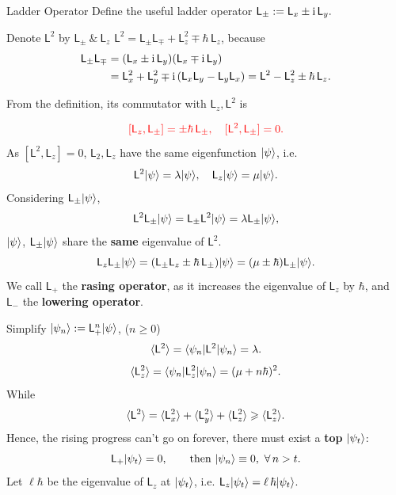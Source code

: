 \documentclass{article}
\newcommand*{\op}[1]{\mathsf{#1}}
\newcommand{\spark}[1]{\textcolor{red}{#1}}
\begin{document}
\begin{definition}{Ladder Operator}{}
	Define the useful ladder operator\index{ladder operator $\op{L}_\pm$} $\op{L}_\pm:=\op{L}_x\pm \i\,\op{L}_y.$
	\begin{example}{Denote $\op{L}^2$ by $\op{L}_\pm~\&~\op{L}_z$}{}
		$\op{L}^2=\op{L}_\pm\op{L}_\mp+\op{L}_z^2\mp\hbar\,\op{L}_z$, because
		\begin{align*}
			\op{L}_\pm\op{L}_\mp & =(\op{L}_x\pm \i\,\op{L}_y)(\op{L}_x\mp \i\,\op{L}_y)                                      \\
			               & =\op{L}_x^2+\op{L}_y^2\mp \i\,(\op{L}_x\op{L}_y-\op{L}_y\op{L}_x)=\op{L}^2-\op{L}_z^2\pm\hbar\,\op{L}_z.
		\end{align*}
	\end{example}
	From the definition, its commutator with $\op{L}_z,\op{L}^2$ is

	$$\spark{[\op{L}_z,\op{L}_\pm]=\pm\hbar\,\op{L}_\pm,\quad[\op{L}^2,\op{L}_\pm]=0.}$$
	As $[\op{L}^2,\op{L}_z]=0$, $\op{L}_2,\op{L}_z$ have the same eigenfunction $\lvert\psi\rangle$, i.e.
	$$\op{L}^2\ket\psi=\lambda\ket\psi,\quad\op{L}_z\ket\psi=\mu\ket\psi.$$
	Considering $\op{L}_\pm\ket\psi$,
	$$\op{L}^2\op{L}_\pm\ket\psi=\op{L}_\pm\op{L}^2\ket\psi=\lambda\op{L}_\pm\ket\psi,$$
	$\lvert\psi\rangle$, $\op{L}_\pm\ket\psi$ share the \textbf{same} eigenvalue of $\op{L}^2$.
	$$\op{L}_z\op{L}_\pm\ket\psi=(\op{L}_\pm\op{L}_z\pm\hbar\,\op{L}_\pm)\ket\psi=(\mu\pm\hbar)\op{L}_\pm\ket\psi.$$
	We call $\op{L}_+$ the \textbf{rasing operator}, as it increases the eigenvalue of $\op{L}_z$ by $\hbar$, and $\op{L}_-$ the \textbf{lowering operator}.
\end{definition}
\noindent Simplify $\ket{\psi_n}:=\op{L}_+^n\ket\psi$, ($n\geqslant 0$)
$$\ave{\op{L}^2}=\bra{\psi_n}\op{L}^2\ket{\psi_n}=\lambda.$$
$$\ave{\op{L}_z^2}=\bra{\psi_n}\op{L}_z^2\ket{\psi_n}=(\mu+n\hbar)^2.$$
While
$$\ave{\op{L}^2}=\ave{\op{L}_x^2}+\ave{\op{L}_y^2}+\ave{\op{L}_z^2}\geqslant\ave{\op{L}_z^2}.$$
Hence, the rising progress can't go on forever, there must exist a \textbf{top} $\lvert\psi_t\rangle$:
$$\op{L}_+\ket{\psi_t}=0,\qquad{\rm then}~\ket{\psi_n}\equiv 0,~\forall\,n>t.$$
Let $\ell\hbar$ be the eigenvalue of $\op{L}_z$ at $\lvert\psi_t\rangle$, i.e. $\op{L}_z\ket{\psi_t}=\ell\,\hbar\ket{\psi_t}$.
\end{document}
